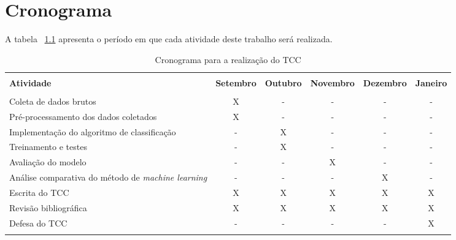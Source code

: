 \chapter{Cronograma}

A tabela ~\ref{tab:cronograma} apresenta o período em que cada atividade deste trabalho será realizada.

\begin{table}[h!]
    \caption{Cronograma para a realização do TCC}
    \label{tab:cronograma}
    \begin{tabular}{p{6cm} c c c c c} %
      \hline \\
      \textbf{Atividade} & \textbf{Setembro} & \textbf{Outubro} & \textbf{Novembro} & \textbf{Dezembro} & \textbf{Janeiro} \\
      \hline \\
      Coleta de dados brutos & X & - & - & - & - \\
      Pré-processamento dos dados coletados & X & - & - & - & - \\
      Implementação do algoritmo de classificação & - & X & - & - & - \\
      Treinamento e testes & - & X & - & - & - \\ 
      Avaliação do modelo & - & - & X & - & - \\
      Análise comparativa do método de \textit{machine learning} & - & - & - & X & - \\
      Escrita do TCC & X & X & X & X & X \\
      Revisão bibliográfica & X & X & X & X & X \\
      Defesa do TCC & - & - & - & - & X \\
      \hline \\
    \end{tabular}
\end{table}